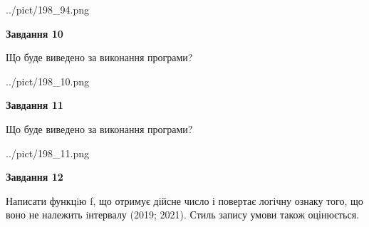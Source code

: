 \documentclass[12pt, ukrainian]{article}
\begin{document}
{\begin {large}
\begin{center}
	{../pict/198_94.png}
\end{center}
\newpage

{\begin {center}\textbf{Завдання 10}\end {center}}

Що буде виведено за виконання програми?\par
\begin{center}
	{../pict/198_10.png}
\end{center}
\newpage

{\begin {center}\textbf{Завдання 11}\end {center}}

Що буде виведено за виконання програми?\par
\begin{center}
	{../pict/198_11.png}
\end{center}
\newpage

{\begin {center}\textbf{Завдання 12}\end {center}}


Написати функцiю f, що отримує дійсне число і повертає логічну ознаку того, що воно не належить iнтервалу (2019; 2021). Стиль запису умови також оцінюється.\par
\newpage

\end {large}}
\end{document}
